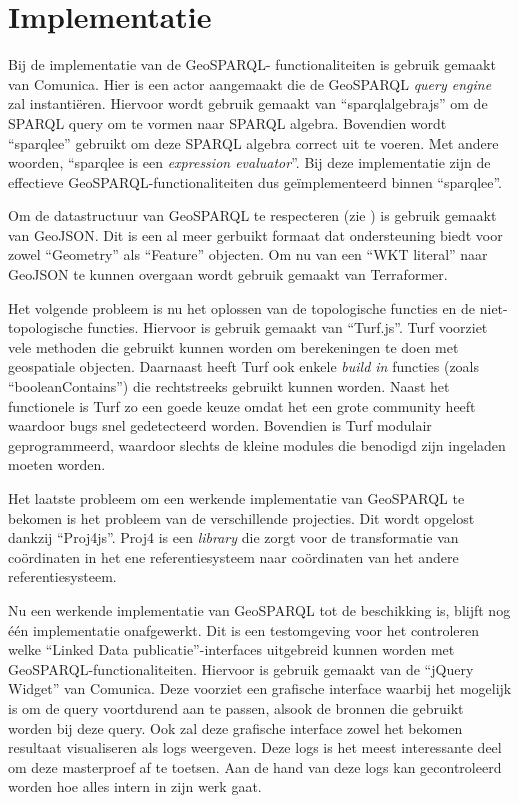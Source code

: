 \documentclass[twocolumn]{phdsymp} %
\begin{document}
\section{Implementatie}
Bij de implementatie van de GeoSPARQL- functionaliteiten is gebruik gemaakt van Comunica. Hier is een actor aangemaakt die de GeoSPARQL \textit{query engine} zal instantiëren. Hiervoor wordt gebruik gemaakt van ``sparqlalgebrajs'' om de SPARQL query om te vormen naar SPARQL algebra. Bovendien wordt ``sparqlee'' gebruikt om deze SPARQL algebra correct uit te voeren. Met andere woorden, ``sparqlee is een \textit{expression evaluator}''. Bij deze implementatie zijn de effectieve GeoSPARQL-functionaliteiten dus geïmplementeerd binnen ``sparqlee''. 

Om de datastructuur van GeoSPARQL te respecteren (zie ) is gebruik gemaakt van GeoJSON. Dit is een al meer gerbuikt formaat dat ondersteuning biedt voor zowel ``Geometry'' als ``Feature'' objecten. Om nu van een ``WKT literal'' naar GeoJSON te kunnen overgaan wordt gebruik gemaakt van Terraformer. 

Het volgende probleem is nu het oplossen van de topologische functies en de niet-topologische functies. Hiervoor is gebruik gemaakt van ``Turf.js''. Turf voorziet vele methoden die gebruikt kunnen worden om berekeningen te doen met geospatiale objecten. Daarnaast heeft Turf ook enkele \textit{build in} functies (zoals ``booleanContains'') die rechtstreeks gebruikt kunnen worden. Naast het functionele is Turf zo een goede keuze omdat het een grote community heeft waardoor bugs snel gedetecteerd worden. Bovendien is Turf modulair geprogrammeerd, waardoor slechts de kleine modules die benodigd zijn ingeladen moeten worden. 

Het laatste probleem om een werkende implementatie van GeoSPARQL te bekomen is het probleem van de verschillende projecties. Dit wordt opgelost dankzij ``Proj4js''. Proj4 is een \textit{library} die zorgt voor de transformatie van coördinaten in het ene referentiesysteem naar coördinaten van het andere referentiesysteem. 

Nu een werkende implementatie van GeoSPARQL tot de beschikking is, blijft nog één implementatie onafgewerkt. Dit is een testomgeving voor het controleren welke ``Linked Data publicatie''-interfaces uitgebreid kunnen worden met GeoSPARQL-functionaliteiten. Hiervoor is gebruik gemaakt van de ``jQuery Widget'' van Comunica. Deze voorziet een grafische interface waarbij het mogelijk is om de query voortdurend aan te passen, alsook de bronnen die gebruikt worden bij deze query. Ook zal deze grafische interface zowel het bekomen resultaat visualiseren als logs weergeven. Deze logs is het meest interessante deel om deze masterproef af te toetsen. Aan de hand van deze logs kan gecontroleerd worden hoe alles intern in zijn werk gaat. 
\end{document}
